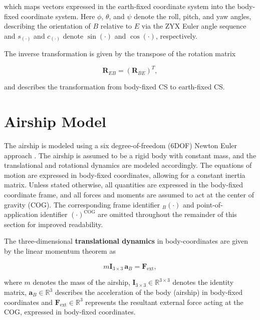 which maps vectors expressed in the earth-fixed coordinate system into the body-fixed coordinate system.
Here $\phi$, $\theta$, and $\psi$ denote the roll, pitch, and yaw angles, describing the orientation of $B$ relative to $E$ via the ZYX Euler angle sequence and $s_{(\cdot)}$ and $c_{(\cdot)}$ denote $\sin(\cdot)$ and $\cos(\cdot)$, respectively.

The inverse transformation is given by the transpose of the rotation matrix

\begin{equation}
	\bm{R}_{EB}
	=
	\left( \bm{R}_{BE} \right)^T,
\end{equation}

and describes the transformation from body-fixed CS to earth-fixed CS. 





\section{Airship Model}
\label{sec:2.2AirshipModel}
%

The airship is modeled using a six degree-of-freedom (6DOF) Newton Euler approach \cite{Fossen2021Handbook}. The airship is assumed to be a rigid body with constant mass, and the translational and rotational dynamics are modeled accordingly. The equations of motion are expressed in body-fixed coordinates, allowing for a constant inertia matrix.
Unless stated otherwise, all quantities are expressed in the body-fixed coordinate frame, and all forces and moments are assumed to act at the center of gravity (COG). The corresponding frame identifier ${}_B(\cdot)$ and point-of-application identifier $(\cdot)^\mathrm{COG}$ are omitted throughout the remainder of this section for improved readability.


The three-dimensional \textbf{translational dynamics} in body-coordinates are given by the linear momentum theorem as


\begin{equation}
	m\bm{I}_{3\times3} \, \bm{a}_B 
	= 
	\bm{F}_\mathrm{ext},
	\label{eq:Impulssatz}
\end{equation}

where $m$ denotes the mass of the airship, $\bm{I}_{3\times3} \in\mathbb{R}^{3\times3}$ denotes the identity matrix, $\bm{a}_B \in \mathbb{R}^3$ describes the acceleration of the body (airship) in body-fixed coordinates and $\bm{F}_\mathrm{ext} \in \mathbb{R}^3$ represents the resultant external force acting at the COG, expressed in body-fixed coordinates. 


